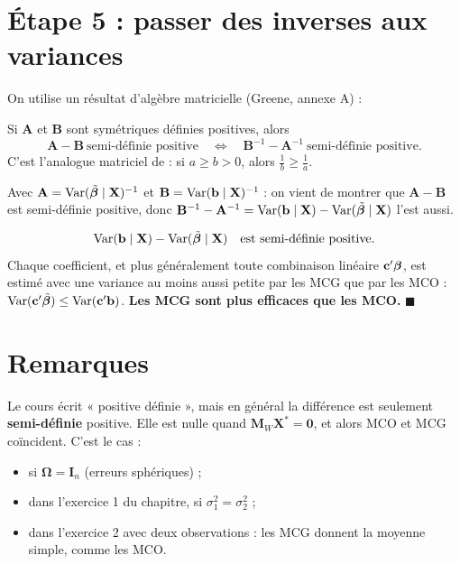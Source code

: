 \documentclass[11pt,a4paper]{article}
\newcommand{\Xs}{\mathbf{X}^{*}}\newcommand{\W}{\mathbf{W}}
\newcommand{\I}{\mathbf{I}}\newcommand{\Pm}{\mathbf{P}}\newcommand{\Om}{\bm{\Omega}}
\newcommand{\A}{\mathbf{A}}\newcommand{\B}{\mathbf{B}}\newcommand{\D}{\mathbf{D}}
\newcommand{\Mw}{\mathbf{M}_W}
\newcommand{\Var}{\operatorname{Var}}\newcommand{\E}{\mathbb{E}}
\begin{document}
\section*{Étape 5 : passer des inverses aux variances}

On utilise un résultat d'algèbre matricielle (Greene, annexe A) :

\begin{tcolorbox}[colback=white,colframe=gray!60!black]
Si $\A$ et $\B$ sont symétriques définies positives, alors
\[
\A-\B\ \text{semi-définie positive}\quad\Longleftrightarrow\quad \B^{-1}-\A^{-1}\ \text{semi-définie positive}.
\]
C'est l'analogue matriciel de : si $a\ge b>0$, alors $\frac1b\ge\frac1a$.
\end{tcolorbox}

Avec $\A=\Var(\tbeta\mid\vX)^{-1}$ et $\B=\Var(\vb\mid\vX)^{-1}$ : on vient de montrer que $\A-\B$ est semi-définie positive, donc $\B^{-1}-\A^{-1}=\Var(\vb\mid\vX)-\Var(\tbeta\mid\vX)$ l'est aussi.

\begin{resultat}[title={Conclusion}]
\[
\Var(\vb\mid\vX)-\Var(\tbeta\mid\vX)\quad\text{est semi-définie positive.}
\]
Chaque coefficient, et plus généralement toute combinaison linéaire $\mathbf{c}'\bm{\beta}$, est estimé avec une variance au moins aussi petite par les MCG que par les MCO : $\Var(\vc'\tbeta)\le\Var(\vc'\vb)$. \textbf{Les MCG sont plus efficaces que les MCO.} \hfill$\blacksquare$
\end{resultat}

\section*{Remarques}

\begin{attention}[title={« Définie » ou « semi-définie » positive ?}]
Le cours écrit « positive définie », mais en général la différence est seulement \textbf{semi-définie} positive. Elle est nulle quand $\Mw\Xs=\mathbf 0$, et alors MCO et MCG coïncident. C'est le cas :
\begin{itemize}[nosep]
\item si $\Om=\I_n$ (erreurs sphériques) ;
\item dans l'exercice 1 du chapitre, si $\sigma_1^2=\sigma_2^2$ ;
\item dans l'exercice 2 avec deux observations : les MCG donnent la moyenne simple, comme les MCO.
\end{itemize}
\end{attention}
\end{document}
